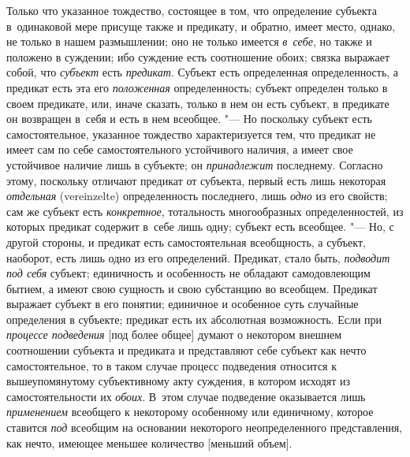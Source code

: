 Только что указанное тождество, состоящее в том, что определение субъекта
в~одинаковой мере присуще также и предикату, и обратно, имеет место, однако,
не только в нашем размышлении; оно не только имеется {\em в~себе}, но
также и положено в суждении; ибо суждение есть соотношение обоих; связка
выражает собой, что {\em субъект} есть {\em предикат}.
Субъект есть определенная определенность, а предикат есть эта его
{\em положенная} определенность; субъект определен только в своем предикате,
или, иначе сказать, только в нем он есть субъект, в предикате он возвращен
в~себя и есть в нем всеобщее. "--- Но поскольку субъект есть
самостоятельное, указанное тождество характеризуется тем, что предикат не
имеет сам по себе самостоятельного устойчивого наличия, а имеет свое
устойчивое наличие лишь в субъекте; он {\em принадлежит} последнему. Согласно
этому, поскольку отличают предикат от субъекта, первый есть лишь некоторая
{\em отдельная} (verein\-zelte) определенность последнего, лишь {\em одно} из
его свойств; сам же субъект есть {\em конкретное}, тотальность многообразных
определенностей, из которых предикат содержит в~себе лишь одну; субъект есть
всеобщее. "--- Но, с другой стороны, и предикат есть самостоятельная
всеобщность, а субъект, наоборот, есть лишь одно из его определений. Предикат,
стало быть, {\em подводит под себя} субъект; единичность и особенность не
обладают самодовлеющим бытием, а имеют свою сущность и свою субстанцию во
всеобщем. Предикат выражает субъект в его понятии; единичное и особенное суть
случайные определения в субъекте; предикат есть их абсолютная возможность.
Если при {\em процессе подведения} [под более общее] думают о некотором внешнем
соотношении субъекта и предиката и представляют себе субъект как нечто
самостоятельное, то в таком случае процесс подведения относится к
вышеупомянутому субъективному акту суждения, в котором исходят из
самостоятельности их {\em обоих}. В~этом случае подведение оказывается лишь
{\em применением} всеобщего к некоторому особенному или единичному, которое
ставится {\em под} всеобщим на основании некоторого неопределенного
представления, как нечто, имеющее меньшее количество [меньший объем].

